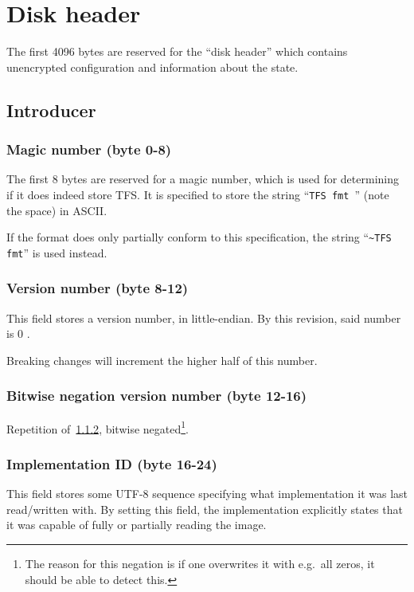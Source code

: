 \documentclass[11pt,a4paper]{report}
\newcommand{\clustersize}{4096 }
\newcommand{\versionnumber}{0 }
\begin{document}
    \chapter{Disk header}
    The first \clustersize bytes are reserved for the ``disk header'' which
    contains unencrypted configuration and information about the state.

    \section{Introducer}
        \subsection{Magic number (byte 0-8)}
        The first 8 bytes are reserved for a magic number, which is used for
        determining if it does indeed store TFS\@. It is specified to store the
        string ``\texttt{TFS fmt }'' (note the space) in ASCII.

        If the format does only partially conform to this specification, the
        string ``\texttt{\textasciitilde TFS fmt}'' is used instead.

        \subsection{Version number (byte 8-12)}
        \label{header:versionnumber}
        This field stores a version number, in little-endian. By this revision,
        said number is \versionnumber.

        Breaking changes will increment the higher half of this number.

        \subsection{Bitwise negation version number (byte 12-16)}
        Repetition of~\ref{header:versionnumber}, bitwise
        negated\footnote{The reason for this negation is if one overwrites it
        with e.g.\ all zeros, it should be able to detect this.}.

        \subsection{Implementation ID (byte 16-24)}
        \label{header:implementationid}
        This field stores some UTF-8 sequence specifying what implementation it
        was last read/written with. By setting this field, the implementation
        explicitly states that it was capable of fully or partially reading the
        image.
\end{document}
